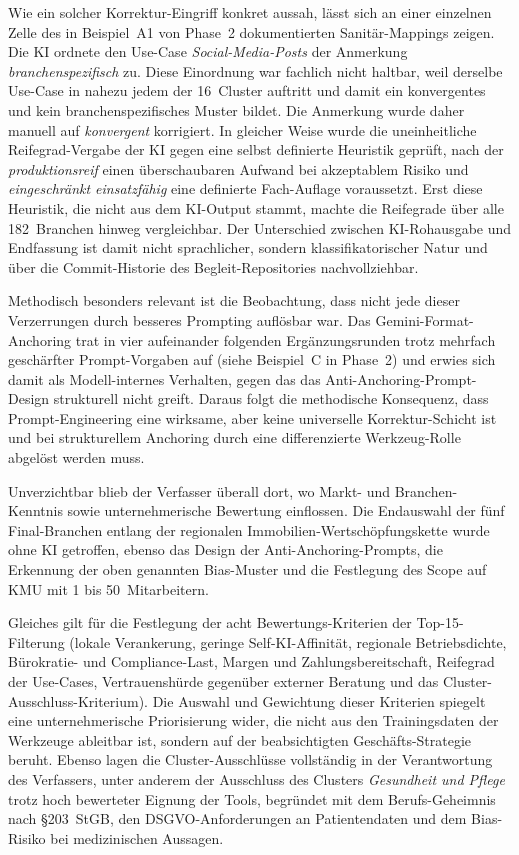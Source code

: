 \documentclass[a4paper,11pt]{article}
\begin{document}
Wie ein solcher Korrektur-Eingriff konkret aussah, lässt sich an einer
einzelnen Zelle des in Beispiel~A1 von Phase~2 dokumentierten
Sanitär-Mappings zeigen. Die KI ordnete den Use-Case
\emph{Social-Media-Posts} der Anmerkung \emph{branchenspezifisch} zu.
Diese Einordnung war fachlich nicht haltbar, weil derselbe Use-Case in
nahezu jedem der 16~Cluster auftritt und damit ein konvergentes und kein
branchenspezifisches Muster bildet. Die Anmerkung wurde daher manuell auf
\emph{konvergent} korrigiert. In gleicher Weise wurde die uneinheitliche
Reifegrad-Vergabe der KI gegen eine selbst definierte Heuristik geprüft,
nach der \emph{produktionsreif} einen überschaubaren Aufwand bei
akzeptablem Risiko und \emph{eingeschränkt einsatzfähig} eine definierte
Fach-Auflage voraussetzt. Erst diese Heuristik, die nicht aus dem
KI-Output stammt, machte die Reifegrade über alle 182~Branchen hinweg
vergleichbar. Der Unterschied zwischen KI-Rohausgabe und Endfassung ist
damit nicht sprachlicher, sondern klassifikatorischer Natur und über die
Commit-Historie des Begleit-Repositories nachvollziehbar.

Methodisch besonders relevant ist die Beobachtung, dass nicht jede
dieser Verzerrungen durch besseres Prompting auflösbar war. Das
Gemini-Format-Anchoring trat in vier aufeinander folgenden
Ergänzungsrunden trotz mehrfach geschärfter Prompt-Vorgaben auf (siehe
Beispiel~C in Phase~2) und erwies sich damit als Modell-internes
Verhalten, gegen das das Anti-Anchoring-Prompt-Design strukturell
nicht greift. Daraus folgt die methodische Konsequenz, dass
Prompt-Engineering eine wirksame, aber keine universelle
Korrektur-Schicht ist und bei strukturellem Anchoring durch eine
differenzierte Werkzeug-Rolle abgelöst werden muss.

Unverzichtbar blieb der Verfasser überall dort, wo Markt- und
Branchen-Kenntnis sowie unternehmerische Bewertung einflossen. Die
Endauswahl der fünf Final-Branchen entlang der regionalen
Immobilien-Wertschöpfungskette wurde ohne KI getroffen, ebenso das
Design der Anti-Anchoring-Prompts, die Erkennung der oben genannten
Bias-Muster und die Festlegung des Scope auf KMU mit 1 bis
50~Mitarbeitern.

Gleiches gilt für die Festlegung der acht Bewertungs-Kriterien der
Top-15-Filterung (lokale Verankerung, geringe Self-KI-Affinität,
regionale Betriebsdichte, Bürokratie- und Compliance-Last, Margen und
Zahlungsbereitschaft, Reifegrad der Use-Cases, Vertrauenshürde
gegenüber externer Beratung und das Cluster-Ausschluss-Kriterium). Die
Auswahl und Gewichtung dieser Kriterien spiegelt eine unternehmerische
Priorisierung wider, die nicht aus den Trainingsdaten der Werkzeuge
ableitbar ist, sondern auf der beabsichtigten Geschäfts-Strategie
beruht. Ebenso lagen die Cluster-Ausschlüsse vollständig in der
Verantwortung des Verfassers, unter anderem der Ausschluss des Clusters
\emph{Gesundheit und Pflege} trotz hoch bewerteter Eignung der Tools,
begründet mit dem Berufs-Geheimnis nach §203~StGB, den
DSGVO-Anforderungen an Patientendaten und dem Bias-Risiko bei
medizinischen Aussagen.
\end{document}
